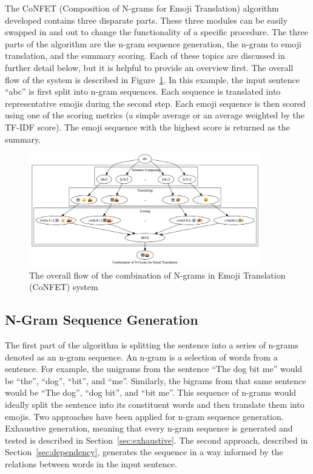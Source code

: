 \documentclass{article}[10]
\begin{document}
The CoNFET (Composition of N-grams for Emoji Translation) algorithm
developed contains three disparate parts. These three modules can be
easily swapped in and out to change the functionality of a specific
procedure. The three parts of the algorithm are the n-gram sequence
generation, the n-gram to emoji translation, and the summary scoring.
Each of these topics are discussed in further detail below, but it is
helpful to provide an overview first. The overall flow of the system is
described in Figure~\ref{fig:flow}. In this example,
the input sentence ``abc'' is first split into n-gram sequences. Each
sequence is translated into representative emojis during the second
step. Each emoji sequence is then scored using one of the scoring
metrics (a simple average or an average weighted by the TF-IDF score).
The emoji sequence with the highest score is returned as the summary.

\begin{figure}[h]
  \begin{center}
    \includegraphics[width=0.90\textwidth]{figures/flow.png}
    \caption{The overall flow of the combination of N-grams in Emoji Translation
      (CoNFET) system\label{fig:flow}}
  \end{center}
\end{figure}

\subsection{N-Gram Sequence Generation\label{sec:N-gramSequenceGeneration}}

The first part of the algorithm is splitting the sentence into a series
of n-grams denoted as an n-gram sequence. An n-gram is a selection of
words from a sentence. For example, the unigrams from the sentence ``The
dog bit me'' would be ``the'', ``dog'', ``bit'', and ``me''. Similarly,
the bigrams from that same sentence would be ``The dog'', ``dog bit'',
and ``bit me''. This sequence of n-grams would ideally split the
sentence into its constituent words and then translate them into emojis.
Two approaches have been applied for n-gram sequence generation.
Exhaustive generation, meaning that every n-gram sequence is generated
and tested is described in Section~\ref{sec:exhaustive}. The second approach, described
in Section~\ref{sec:dependency}, generates the sequence in a
way informed by the relations between words in the input sentence.
\end{document}

